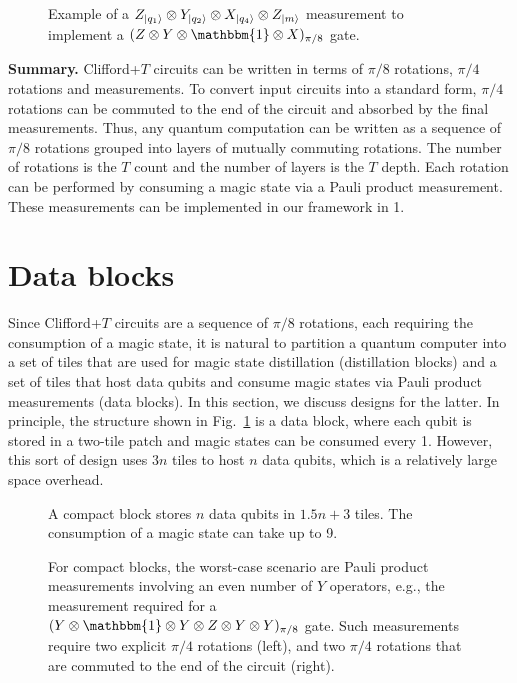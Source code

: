 \documentclass[prx,aps,letterpaper,twocolumn,allowfontchageintitle=true,accepted=2019-02-01]{quantumarticle}
\begin{document}
\begin{figure}[t!]
\centering
\def\svgwidth{\linewidth}

\caption{Example of a $Z_{\ket{q_1}}\otimes Y_{\ket{q_2}} \otimes X_{\ket{q_4}} \otimes Z_{\ket{m}}$ measurement to implement a $(Z\otimes Y \otimes \mathbbm{1} \otimes X)_{\pi/8}$ gate.}
\label{fig:pauliprodmeas}
\end{figure}

\textbf{Summary.} Clifford+$T$ circuits can be written in terms of $\pi/8$ rotations, $\pi/4$ rotations and measurements. To convert input circuits into a standard form, $\pi/4$ rotations can be commuted to the end of the circuit and absorbed by the final measurements. Thus, any quantum computation can be written as a sequence of $\pi/8$ rotations grouped into layers of mutually commuting rotations. The number of rotations is the $T$ count and the number of layers is the $T$ depth. Each rotation can be performed by consuming a magic state via a Pauli product measurement. These measurements can be implemented in our framework in 1\clock.

\section{Data blocks}
\label{sec:datablock}

Since Clifford+$T$ circuits are a sequence of $\pi/8$ rotations, each requiring the consumption of a magic state, it is natural to partition a quantum computer into a set of tiles that are used for magic state distillation (distillation blocks) and a set of tiles that host data qubits and consume magic states via Pauli product measurements (data blocks). In this section, we discuss designs for the latter. In principle, the structure shown in Fig.~\ref{fig:pauliprodmeas} is a data block, where each qubit is stored in a two-tile patch and magic states can be consumed every 1\clock. However, this sort of design uses $3n$ tiles to host $n$ data qubits, which is a relatively large space overhead.

\begin{figure}[t!]
\centering
\def\svgwidth{0.85\linewidth}

\caption{A compact block stores $n$ data qubits in $1.5n+3$ tiles. The consumption of a magic state can take up to 9\clock.}
\label{fig:compactblock1}
\end{figure}

\begin{figure}[b!]
\centering
\def\svgwidth{0.85\linewidth}

\caption{For compact blocks, the worst-case scenario are Pauli product measurements involving an even number of $Y$ operators, e.g., the measurement required for a $(Y \otimes \mathbbm{1} \otimes Y \otimes Z \otimes Y \otimes Y)_{\pi/8}$ gate. Such measurements require two explicit $\pi/4$ rotations (left), and two $\pi/4$ rotations that are commuted to the end of the circuit (right).}
\label{fig:compactblock2}
\end{figure}
\end{document}
